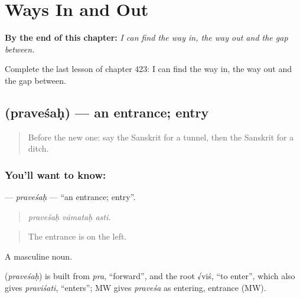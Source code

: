 
\chapter{Ways In and Out}
\label{ch:sa-ways-in-and-out}

\begin{chapteropening}
\textbf{By the end of this chapter:} \emph{I can find the way in, the way out and the gap between.}

Complete the last lesson of chapter 423: I can find the way in, the way out and the gap between.
\end{chapteropening}

\section[\texorpdfstring{\sk{प्रवेशः} (praveśaḥ)}{प्रवेशः (praveśaḥ)}]{ (praveśaḥ) — an entrance; entry}

\label{lesson:SA-C423-pravesah}



\begin{quote}
Before the new one: say the Sanskrit for a tunnel, then the Sanskrit for a ditch.
\end{quote}

\subsection*{You'll want to know: }
\textbf{} — \emph{praveśaḥ} — \textquotedblleft{}an entrance; entry\textquotedblright{}.

\begin{quote}
  
\end{quote}

\begin{quote}
\emph{praveśaḥ vāmataḥ asti.}
\end{quote}

\begin{quote}
The entrance is on the left.
\end{quote}

A masculine noun.

\begin{cousinweb}
\textbf{} (\emph{praveśaḥ}) is built from \emph{pra}, \textquotedblleft{}forward\textquotedblright{}, and the root √viś, \textquotedblleft{}to enter\textquotedblright{}, which also gives \emph{praviśati}, \textquotedblleft{}enters\textquotedblright{}; MW gives \emph{praveśa} as entering, entrance (MW).
\end{cousinweb}

